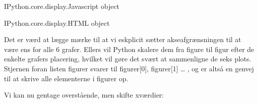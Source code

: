 \documentclass[letterpaper,10pt,english]{jupyterBook}
\begin{document}
\begin{sphinxVerbatim}[commandchars=\\\{\}]
\PYGZlt{}IPython.core.display.Javascript object\PYGZgt{}
\end{sphinxVerbatim}

\begin{sphinxVerbatim}[commandchars=\\\{\}]
\PYGZlt{}IPython.core.display.HTML object\PYGZgt{}
\end{sphinxVerbatim}

Det er værd at lægge mærke til at vi eskplicit sætter akseafgrænsningen til at være ens for alle 6 grafer. Ellers vil Python skalere dem fra figure til figur efter de enkelte grafers placering, hvilket vil gøre det svært at sammenligne de seks plots. Stjernen foran listen figurer svarer til figurer{[}0{]}, figurer{[}1{]} … , og er altså en genvej til at skrive alle elementerne i figurer op.

Vi kan nu gentage overstående, men skifte x\sphinxhyphen{}værdier:

\begin{sphinxVerbatim}[commandchars=\\\{\}]
  \PYG{p}{[}     \PYG{p}{]}  
    \PYG{p}{[}\PYG{p}{]}     

   
             
                            
                                  
                                
                 
    
                        
\end{sphinxVerbatim}
\end{document}
